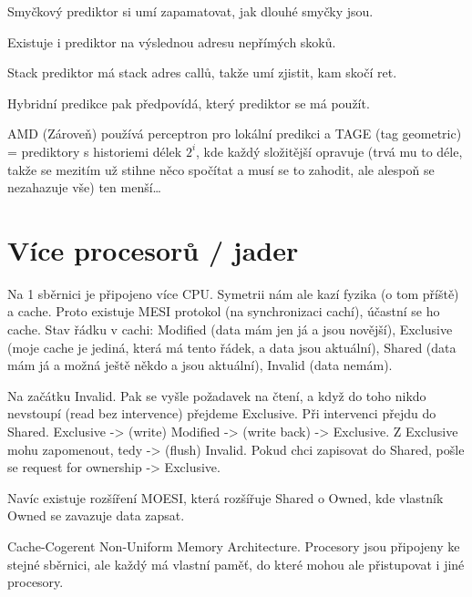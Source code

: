 \documentclass[12pt]{article}                   %
\begin{document}
        \begin{definice}
            Smyčkový prediktor si umí zapamatovat, jak dlouhé smyčky jsou.

            Existuje i prediktor na výslednou adresu nepřímých skoků.

            Stack prediktor má stack adres callů, takže umí zjistit, kam skočí ret.

            Hybridní predikce pak předpovídá, který prediktor se má použít.
        \end{definice}

        \begin{definice}
            AMD (Zároveň) používá perceptron pro lokální predikci a TAGE (tag geometric) = prediktory s historiemi délek $2^i$, kde každý složitější opravuje (trvá mu to déle, takže se mezitím už stihne něco spočítat a musí se to zahodit, ale alespoň se nezahazuje vše) ten menší…
        \end{definice}


\section{Více procesorů / jader}
        \begin{definice}
            Na 1 sběrnici je připojeno více CPU. Symetrii nám ale kazí fyzika (o tom příště) a cache. Proto existuje MESI protokol (na synchronizaci cachí), účastní se ho cache. Stav řádku v cachi: Modified (data mám jen já a jsou novější), Exclusive (moje cache je jediná, která má tento řádek, a data jsou aktuální), Shared (data mám já a možná ještě někdo a jsou aktuální), Invalid (data nemám).

            Na začátku Invalid. Pak se vyšle požadavek na čtení, a když do toho nikdo nevstoupí (read bez intervence) přejdeme Exclusive. Při intervenci přejdu do Shared. Exclusive -> (write) Modified -> (write back) -> Exclusive. Z Exclusive mohu zapomenout, tedy -> (flush) Invalid. Pokud chci zapisovat do Shared, pošle se request for ownership -> Exclusive.

            Navíc existuje rozšíření MOESI, která rozšířuje Shared o Owned, kde vlastník Owned se zavazuje data zapsat.
        \end{definice}


        \begin{definice}[cc/NUMA]
            Cache-Cogerent Non-Uniform Memory Architecture. Procesory jsou připojeny ke stejné sběrnici, ale každý má vlastní paměť, do které mohou ale přistupovat i jiné procesory.
        \end{definice}
\end{document}
